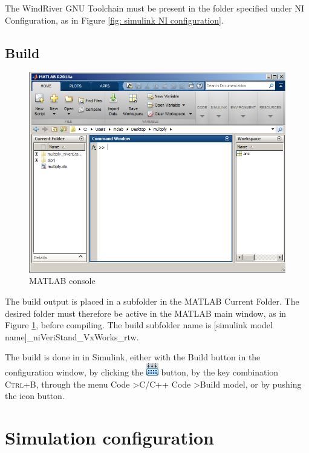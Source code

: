 \documentclass[a4paper,twoside,english]{report}
\newcommand{\noun}[1]{\textsc{#1}}
\begin{document}
The WindRiver GNU Toolchain must be present in the folder specified
under NI Configuration, as in Figure \ref{fig: simulink NI configuration}.

\subsection{\label{subsec: Simulink model build}Build}

\begin{figure}[!h]
\centering \includegraphics[scale=0.45]{fig/matlab_command} \caption{MATLAB console}

\label{fig: matlab console} 
\end{figure}

The build output is placed in a subfolder in the MATLAB Current Folder.
The desired folder must therefore be active in the MATLAB main window,
as in Figure \ref{fig: matlab console}, before compiling. The build
subfolder name is {[}simulink model name{]}\_niVeriStand\_VxWorks\_rtw.

The build is done in in Simulink, either with the Build button in
the configuration window, by clicking the \includegraphics[scale=0.5]{fig/simulink_build}
button, by the key combination \noun{Ctrl+B}, through the menu Code
\textgreater  C/C++ Code \textgreater  Build model, or by pushing
the icon button.

\clearpage{}

\section{Simulation configuration}
\end{document}

